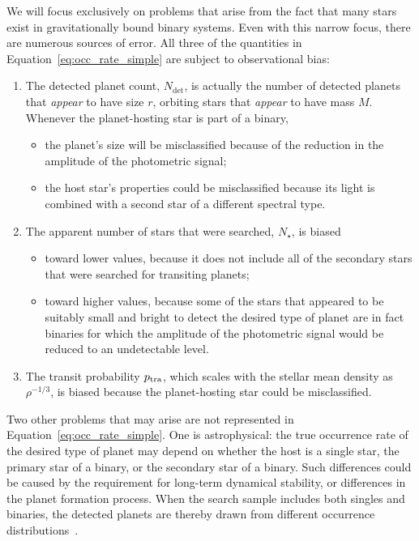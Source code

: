 \documentclass[12pt,modern]{aastex61}
\begin{document}
We will focus exclusively on problems that arise from the fact that
many stars exist in gravitationally bound binary systems.  Even with
this narrow focus, there are numerous sources of error.  All three of
the quantities in Equation~\ref{eq:occ_rate_simple} are subject to
observational bias:
\begin{enumerate}
%    
    \item The detected planet count, $N_{\det}$, is actually the
      number of detected planets that {\it appear} to have size $r$,
      orbiting stars that {\it appear} to have mass $M$.  Whenever the
      planet-hosting star is part of a binary,
%    
    \begin{itemize}
        \item the planet's size will be misclassified because of the
          reduction in the amplitude of the photometric signal;
%        
        \item the host star's properties could be misclassified
          because its light is combined with a second star of a
          different spectral type.
%        
    \end{itemize}
%    
    \item The apparent number of stars that were searched, $N_\star$,
      is biased
%    
    \begin{itemize}
%        
        \item toward lower values, because it does not include all of
          the secondary stars that were searched for transiting
          planets;
%        
        \item toward higher values, because some of the stars that
          appeared to be suitably small and bright to detect the
          desired type of planet are in fact binaries for which the
          amplitude of the photometric signal would be reduced to an
          undetectable level.
%        
    \end{itemize}
%    
    \item The transit probability $p_{\rm tra}$, which scales with the
      stellar mean density as $\rho^{-1/3}$, is biased because the
      planet-hosting star could be misclassified.
%    
\end{enumerate}

Two other problems that may arise are not represented in
Equation~\ref{eq:occ_rate_simple}.  One is astrophysical: the true
occurrence rate of the desired type of planet may depend on whether
the host is a single star, the primary star of a binary, or the
secondary star of a binary.  Such differences could be caused by the
requirement for long-term dynamical stability, or differences in the
planet formation process.  When the search sample includes both
singles and binaries, the detected planets are thereby drawn from
different occurrence 
distributions~\citep[see][]{
    wang_occurrence_2015,kraus_impact_2016}.
\end{document}
